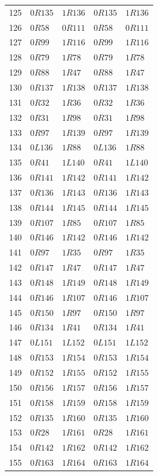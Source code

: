 {\begin{longtable}{@{}rllll@{}}
125 & $0R135$ & $1R136$ & $0R135$ & $1R136$\\
126 & $0R58$ & $0R111$ & $0R58$ & $0R111$\\
127 & $0R99$ & $1R116$ & $0R99$ & $1R116$\\
128 & $0R79$ & $1R78$ & $0R79$ & $1R78$\\
129 & $0R88$ & $1R47$ & $0R88$ & $1R47$\\
130 & $0R137$ & $1R138$ & $0R137$ & $1R138$\\
131 & $0R32$ & $1R36$ & $0R32$ & $1R36$\\
132 & $0R31$ & $1R98$ & $0R31$ & $1R98$\\
133 & $0R97$ & $1R139$ & $0R97$ & $1R139$\\
134 & $0L136$ & $1R88$ & $0L136$ & $1R88$\\
135 & $0R41$ & $1L140$ & $0R41$ & $1L140$\\
136 & $0R141$ & $1R142$ & $0R141$ & $1R142$\\
137 & $0R136$ & $1R143$ & $0R136$ & $1R143$\\
138 & $0R144$ & $1R145$ & $0R144$ & $1R145$\\
139 & $0R107$ & $1R85$ & $0R107$ & $1R85$\\
140 & $0R146$ & $1R142$ & $0R146$ & $1R142$\\
141 & $0R97$ & $1R35$ & $0R97$ & $1R35$\\
142 & $0R147$ & $1R47$ & $0R147$ & $1R47$\\
143 & $0R148$ & $1R149$ & $0R148$ & $1R149$\\
144 & $0R146$ & $1R107$ & $0R146$ & $1R107$\\
145 & $0R150$ & $1R97$ & $0R150$ & $1R97$\\
146 & $0R134$ & $1R41$ & $0R134$ & $1R41$\\
147 & $0L151$ & $1L152$ & $0L151$ & $1L152$\\
148 & $0R153$ & $1R154$ & $0R153$ & $1R154$\\
149 & $0R152$ & $1R155$ & $0R152$ & $1R155$\\
150 & $0R156$ & $1R157$ & $0R156$ & $1R157$\\
151 & $0R158$ & $1R159$ & $0R158$ & $1R159$\\
152 & $0R135$ & $1R160$ & $0R135$ & $1R160$\\
153 & $0R28$ & $1R161$ & $0R28$ & $1R161$\\
154 & $0R142$ & $1R162$ & $0R142$ & $1R162$\\
155 & $0R163$ & $1R164$ & $0R163$ & $1R164$\\

\end{longtable}}

